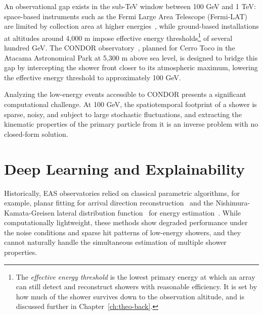 An observational gap exists in the sub-TeV window between 100 GeV and 1 TeV: space-based instruments such as the Fermi Large Area Telescope (Fermi-LAT) are limited by collection area at higher energies~, while ground-based installations at altitudes around 4,000 m impose effective energy thresholds\footnote{The \textit{effective energy threshold} is the lowest primary energy at which an array can still detect and reconstruct showers with reasonable efficiency. It is set by how much of the shower survives down to the observation altitude, and is discussed further in Chapter~\ref{ch:theo-back}.} of several hundred GeV. The CONDOR observatory~, planned for Cerro Toco in the Atacama Astronomical Park at 5,300 m above sea level, is designed to bridge this gap by intercepting the shower front closer to its atmospheric maximum, lowering the effective energy threshold to approximately 100 GeV.

Analyzing the low-energy events accessible to CONDOR presents a significant computational challenge. At 100 GeV, the spatiotemporal footprint of a shower is sparse, noisy, and subject to large stochastic fluctuations, and extracting the kinematic properties of the primary particle from it is an inverse problem with no closed-form solution.

\section{Deep Learning and Explainability}

Historically, EAS observatories relied on classical parametric algorithms, for example, planar fitting for arrival direction reconstruction~ and the Nishimura-Kamata-Greisen lateral distribution function~ for energy estimation~. While computationally lightweight, these methods show degraded performance under the noise conditions and sparse hit patterns of low-energy showers, and they cannot naturally handle the simultaneous estimation of multiple shower properties.

